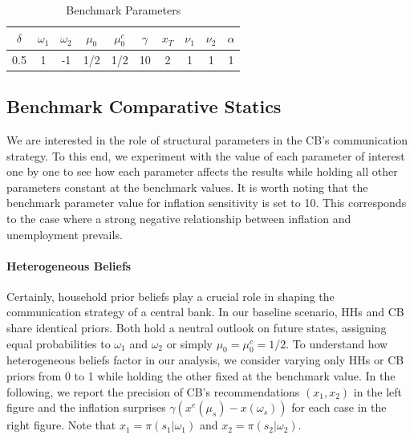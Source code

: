 \documentclass[12pt,a4paper]{article}
\begin{document}
\begin{table}[htp!]
\centering
\begin{tabular}{@{}cccccccccc@{}}
\toprule
$\delta$ & $\omega_1$ & $\omega_2$ & $\mu_0$ & $\mu_0^c$ & $\gamma$ & $x_T$ & $\nu_1$ & $\nu_2$ & $\alpha$\\ \midrule
0.5      & 1          & -1         & 1/2     & 1/2       & 10      & 2     & 1 & 1 & 1   \\ \bottomrule
\end{tabular}
\caption{Benchmark Parameters}
\label{tab:bchmrk_param}
\end{table}

\subsection{Benchmark Comparative Statics} \label{sec:bchmrk_res:comparative}

We are interested in the role of structural parameters in the CB's communication strategy. To this end, we experiment with the value of each parameter of interest one by one to see how each parameter affects the results while holding all other parameters constant at the benchmark values. It is worth noting that the benchmark parameter value for inflation sensitivity is set to 10. This corresponds to the case where a strong negative relationship between inflation and unemployment prevails.

\paragraph{Heterogeneous Beliefs}

Certainly, household prior beliefs play a crucial role in shaping the communication strategy of a central bank. In our baseline scenario, HHs and CB share identical priors. Both hold a neutral outlook on future states, assigning equal probabilities to $\omega_1$ and $\omega_2$ or simply $\mu_0 = \mu_0^c = 1/2$. To understand how heterogeneous beliefs factor in our analysis, we consider varying only HHs or CB priors from 0 to 1 while holding the other fixed at the benchmark value. In the following, we report the precision of CB's recommendations $(x_1,x_2)$ in the left figure and the inflation surprises $\gamma(x^e(\mu_s)-x(\omega_s))$ for each case in the right figure. Note that $x_1=\pi(s_1|\omega_1)$ and $x_2=\pi(s_2|\omega_2)$.
\end{document}
